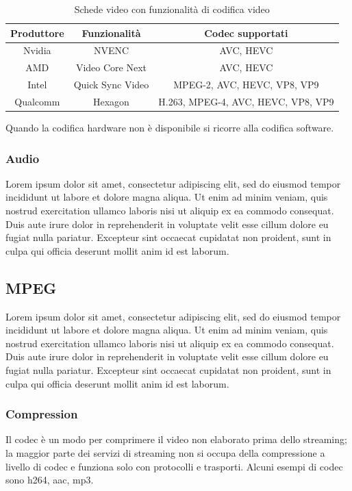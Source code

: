 \begin{table}[H]
	\centering
	\begin{tabular}{||c c c||} 
		\hline
		Produttore & Funzionalità & Codec supportati \\
		\hline\hline
		Nvidia & NVENC & AVC, HEVC \\
		\hline
		AMD & Video Core Next & AVC, HEVC \\
		\hline
		Intel & Quick Sync Video & MPEG-2, AVC, HEVC, VP8, VP9 \\
		\hline
		Qualcomm & Hexagon & H.263, MPEG-4, AVC, HEVC, VP8, VP9 \\
		\hline
	\end{tabular}

	\caption{Schede video con funzionalità di codifica video}
	\label{table:VideoCardEncodingFeature}
\end{table}

Quando la codifica hardware non è disponibile si ricorre alla codifica software.

\subsubsection{Audio}
Lorem ipsum dolor sit amet, consectetur adipiscing elit, sed do eiusmod tempor incididunt ut labore et dolore magna aliqua. Ut enim ad minim veniam, quis nostrud exercitation ullamco laboris nisi ut aliquip ex ea commodo consequat. Duis aute irure dolor in reprehenderit in voluptate velit esse cillum dolore eu fugiat nulla pariatur. Excepteur sint occaecat cupidatat non proident, sunt in culpa qui officia deserunt mollit anim id est laborum.

\subsection{MPEG}
Lorem ipsum dolor sit amet, consectetur adipiscing elit, sed do eiusmod tempor incididunt ut labore et dolore magna aliqua. Ut enim ad minim veniam, quis nostrud exercitation ullamco laboris nisi ut aliquip ex ea commodo consequat. Duis aute irure dolor in reprehenderit in voluptate velit esse cillum dolore eu fugiat nulla pariatur. Excepteur sint occaecat cupidatat non proident, sunt in culpa qui officia deserunt mollit anim id est laborum.

\subsubsection{Compression}
Il codec è un modo per comprimere il video non elaborato prima dello streaming; la maggior parte dei servizi di streaming non si occupa della compressione a livello di codec e funziona solo con protocolli e trasporti. Alcuni esempi di codec sono h264, aac, mp3.

